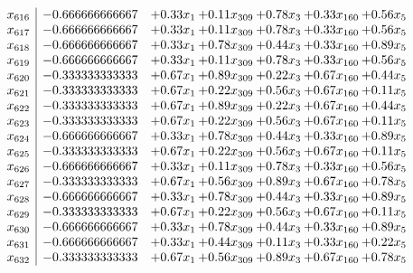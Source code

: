 \documentclass[8pt]{article}
\begin{document}
\[\begin{array}{c| c c@{\hskip 2pt} c@{\hskip 2pt} c@{\hskip 2pt} c@{\hskip 2pt} c@{\hskip 2pt} }
 x_{616}   &  -0.666666666667 & +  0.33 x_{1} & +  0.11 x_{309} & +  0.78 x_{3} & +  0.33 x_{160} & +  0.56 x_{5}\\
 x_{617}   &  -0.666666666667 & +  0.33 x_{1} & +  0.11 x_{309} & +  0.78 x_{3} & +  0.33 x_{160} & +  0.56 x_{5}\\
 x_{618}   &  -0.666666666667 & +  0.33 x_{1} & +  0.78 x_{309} & +  0.44 x_{3} & +  0.33 x_{160} & +  0.89 x_{5}\\
 x_{619}   &  -0.666666666667 & +  0.33 x_{1} & +  0.11 x_{309} & +  0.78 x_{3} & +  0.33 x_{160} & +  0.56 x_{5}\\
 x_{620}   &  -0.333333333333 & +  0.67 x_{1} & +  0.89 x_{309} & +  0.22 x_{3} & +  0.67 x_{160} & +  0.44 x_{5}\\
 x_{621}   &  -0.333333333333 & +  0.67 x_{1} & +  0.22 x_{309} & +  0.56 x_{3} & +  0.67 x_{160} & +  0.11 x_{5}\\
 x_{622}   &  -0.333333333333 & +  0.67 x_{1} & +  0.89 x_{309} & +  0.22 x_{3} & +  0.67 x_{160} & +  0.44 x_{5}\\
 x_{623}   &  -0.333333333333 & +  0.67 x_{1} & +  0.22 x_{309} & +  0.56 x_{3} & +  0.67 x_{160} & +  0.11 x_{5}\\
 x_{624}   &  -0.666666666667 & +  0.33 x_{1} & +  0.78 x_{309} & +  0.44 x_{3} & +  0.33 x_{160} & +  0.89 x_{5}\\
 x_{625}   &  -0.333333333333 & +  0.67 x_{1} & +  0.22 x_{309} & +  0.56 x_{3} & +  0.67 x_{160} & +  0.11 x_{5}\\
 x_{626}   &  -0.666666666667 & +  0.33 x_{1} & +  0.11 x_{309} & +  0.78 x_{3} & +  0.33 x_{160} & +  0.56 x_{5}\\
 x_{627}   &  -0.333333333333 & +  0.67 x_{1} & +  0.56 x_{309} & +  0.89 x_{3} & +  0.67 x_{160} & +  0.78 x_{5}\\
 x_{628}   &  -0.666666666667 & +  0.33 x_{1} & +  0.78 x_{309} & +  0.44 x_{3} & +  0.33 x_{160} & +  0.89 x_{5}\\
 x_{629}   &  -0.333333333333 & +  0.67 x_{1} & +  0.22 x_{309} & +  0.56 x_{3} & +  0.67 x_{160} & +  0.11 x_{5}\\
 x_{630}   &  -0.666666666667 & +  0.33 x_{1} & +  0.78 x_{309} & +  0.44 x_{3} & +  0.33 x_{160} & +  0.89 x_{5}\\
 x_{631}   &  -0.666666666667 & +  0.33 x_{1} & +  0.44 x_{309} & +  0.11 x_{3} & +  0.33 x_{160} & +  0.22 x_{5}\\
 x_{632}   &  -0.333333333333 & +  0.67 x_{1} & +  0.56 x_{309} & +  0.89 x_{3} & +  0.67 x_{160} & +  0.78 x_{5}\\

\end{array}\]
\end{document}
